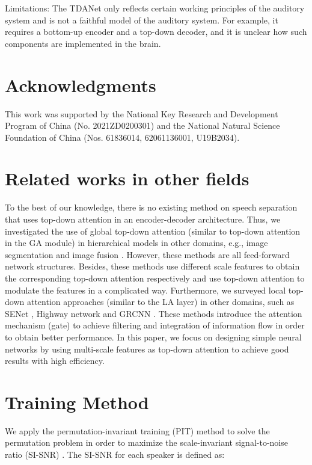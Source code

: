 \documentclass{article} \usepackage{iclr2023_conference,times}
\begin{document}
Limitations: The TDANet only reflects certain working principles of the auditory system and is not a faithful model of the auditory system. For example, it requires a bottom-up encoder and a top-down decoder, and it is unclear how such components are implemented in the brain. 


\section*{Acknowledgments}
This work was supported by the National Key Research and Development Program of China (No. 2021ZD0200301) and the National Natural Science Foundation of China (Nos. 61836014, 62061136001, U19B2034).





\appendix

\section{Related works in other fields}
\label{sec:a-rw}

To the best of our knowledge, there is no existing method on speech separation that uses top-down attention in an encoder-decoder architecture. Thus, we investigated the use of global top-down attention (similar to top-down attention in the GA module) in hierarchical models in other domains, e.g., image segmentation \cite{chen2016attention,sinha2020multi} and image fusion \cite{li2022mafusion}. However, these methods are all feed-forward network structures. Besides, these methods use different scale features to obtain the corresponding top-down attention respectively and use top-down attention to modulate the features in a complicated way. Furthermore, we surveyed local top-down attention approaches (similar to the LA layer) in other domains, such as SENet \citep{hu2018squeeze}, Highway network \citep{srivastava2015highway} and GRCNN \citep{wang2021convolutional}. These methods introduce the attention mechanism (gate) to achieve filtering and integration of information flow in order to obtain better performance. In this paper, we focus on designing simple neural networks by using multi-scale features as top-down attention to achieve good results with high efficiency.

\section{Training Method}
\label{sec:a-tm}
We apply the permutation-invariant training (PIT) method \citep{yu2017permutation} to solve the permutation problem \citep{hershey2016deep} in order to maximize the scale-invariant signal-to-noise ratio (SI-SNR) \citep{le2019sdr}. The SI-SNR for each speaker is defined as:
\end{document}

